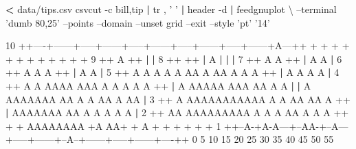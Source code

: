 \documentclass[
]{book}
\newenvironment{Shaded}{\begin{snugshade}}{\end{snugshade}}
\newcommand{\ExtensionTok}[1]{#1}
\newcommand{\FunctionTok}[1]{\textcolor[rgb]{0.00,0.00,0.00}{#1}}
\newcommand{\KeywordTok}[1]{\textcolor[rgb]{0.13,0.29,0.53}{\textbf{#1}}}
\newcommand{\NormalTok}[1]{#1}
\newcommand{\OperatorTok}[1]{\textcolor[rgb]{0.81,0.36,0.00}{\textbf{#1}}}
\newcommand{\StringTok}[1]{\textcolor[rgb]{0.31,0.60,0.02}{#1}}
\theoremstyle{definition}
\theoremstyle{definition}
\theoremstyle{definition}
\theoremstyle{remark}
\begin{document}
\begin{Shaded}
\begin{Highlighting}[]
\OperatorTok{<} \ExtensionTok{data/tips.csv}\NormalTok{ csvcut -c bill,tip }\KeywordTok{|} \FunctionTok{tr}\NormalTok{ , }\StringTok{' '} \KeywordTok{|} \ExtensionTok{header}\NormalTok{ -d }\KeywordTok{|} \ExtensionTok{feedgnuplot}\NormalTok{ \textbackslash{}}
\NormalTok{--terminal }\StringTok{'dumb 80,25'}\NormalTok{ --points --domain --unset grid --exit --style }\StringTok{'pt'} \StringTok{'14'}



  \ExtensionTok{10}\NormalTok{ ++----+------+-----+------+-----+------+-----+------+-----+------+A---++}
     \ExtensionTok{+}\NormalTok{     +      +     +      +     +      +     +      +     +      +     +}
   \ExtensionTok{9}\NormalTok{ ++                                                            A       ++}
     \KeywordTok{|}                                                                      \KeywordTok{|}
   \ExtensionTok{8}\NormalTok{ ++                                                                    ++}
     \KeywordTok{|}                                                  \ExtensionTok{A}                   \KeywordTok{|}
     \KeywordTok{|}                                                                      \KeywordTok{|}
   \ExtensionTok{7}\NormalTok{ ++                                          A                 A       ++}
     \KeywordTok{|}                             \ExtensionTok{A}\NormalTok{     A                                  }\KeywordTok{|}
   \ExtensionTok{6}\NormalTok{ ++                              A    A    A                           ++}
     \KeywordTok{|}                             \ExtensionTok{A}\NormalTok{        A                               }\KeywordTok{|}
   \ExtensionTok{5}\NormalTok{ ++       A                 A A   A A   AA A  AA      A  A     A       ++}
     \KeywordTok{|}                                \ExtensionTok{A}\NormalTok{       A    A     A                  }\KeywordTok{|}
   \ExtensionTok{4}\NormalTok{ ++          A     A  AAAA AAA A  A A  A          A                    ++}
     \KeywordTok{|}                \ExtensionTok{A}\NormalTok{   AAAAA AAA AA            A             A           }\KeywordTok{|}
     \KeywordTok{|}              \ExtensionTok{A}\NormalTok{  AAAAAAA AA A A  AA   A AA                            }\KeywordTok{|}
   \ExtensionTok{3}\NormalTok{ ++           A   AAAAAAAAAAA A A    AA           AA A                 ++}
     \KeywordTok{|}              \ExtensionTok{AAAAAAA}\NormalTok{ AA  A A A     A                   A             }\KeywordTok{|}
   \ExtensionTok{2}\NormalTok{ ++        AA AAAAAAAAA A  A  A AA  A A A                              ++}
     \ExtensionTok{+}\NormalTok{     +   AAAAAAAA +A   AA+     + A    +     +      +     +      +     +}
   \ExtensionTok{1}\NormalTok{ ++--A-+A-A---+--AA-+--A---+-----+------+--A--+------+-----+------+----++}
     \ExtensionTok{0}\NormalTok{     5      10    15     20    25     30    35     40    45     50    55}
\end{Highlighting}
\end{Shaded}
\end{document}

